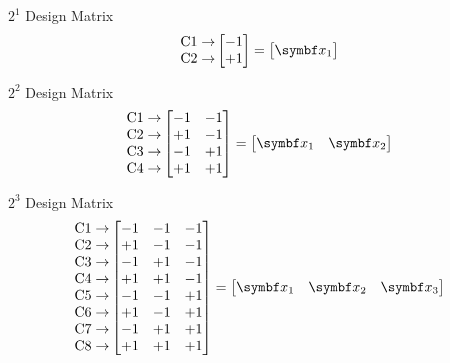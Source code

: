 \begin{Example}{$ 2^1 $ Design Matrix}{}
    \[ \begin{matrix}
            \text{C1}\rightarrow \\
            \text{C2}\rightarrow
        \end{matrix}\begin{bmatrix}
            -1 \\
            +1
        \end{bmatrix}=\begin{bmatrix}
            \Vector{x}_1
        \end{bmatrix} \]
\end{Example}
\begin{Example}{$ 2^2 $ Design Matrix}{}
    \[ \begin{matrix}
            \text{C1}\rightarrow \\
            \text{C2}\rightarrow \\
            \text{C3}\rightarrow \\
            \text{C4}\rightarrow
        \end{matrix}\begin{bmatrix}
            -1 & -1 \\
            +1 & -1 \\
            -1 & +1 \\
            +1 & +1
        \end{bmatrix}=\begin{bmatrix}
            \Vector{x}_1 & \Vector{x}_2
        \end{bmatrix} \]
\end{Example}
\begin{Example}{$ 2^3 $ Design Matrix}{}
    \[ \begin{matrix}
            \text{C1}\rightarrow \\
            \text{C2}\rightarrow \\
            \text{C3}\rightarrow \\
            \text{C4}\rightarrow \\
            \text{C5}\rightarrow \\
            \text{C6}\rightarrow \\
            \text{C7}\rightarrow \\
            \text{C8}\rightarrow
        \end{matrix}\begin{bmatrix}
            -1 & -1 & -1 \\
            +1 & -1 & -1 \\
            -1 & +1 & -1 \\
            +1 & +1 & -1 \\
            -1 & -1 & +1 \\
            +1 & -1 & +1 \\
            -1 & +1 & +1 \\
            +1 & +1 & +1
        \end{bmatrix}=\begin{bmatrix}
            \Vector{x}_1 & \Vector{x}_2 & \Vector{x}_3
        \end{bmatrix} \]
\end{Example}
